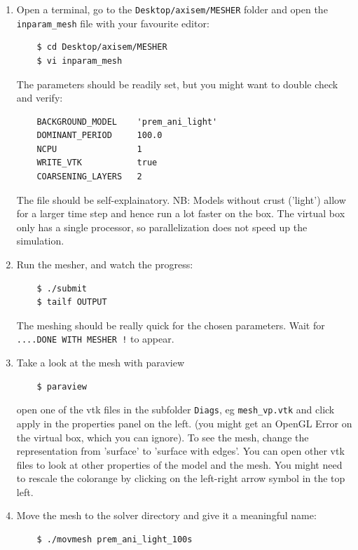 \documentclass{article}
\begin{document}
\begin{enumerate}
    \item Open a terminal, go to the \verb|Desktop/axisem/MESHER| folder and open the
    \verb|inparam_mesh| file with your favourite editor:
    \begin{verbatim}
    $ cd Desktop/axisem/MESHER
    $ vi inparam_mesh
    \end{verbatim}
    The parameters should be readily set, but you might want to double check and verify:
    \begin{verbatim}
    BACKGROUND_MODEL    'prem_ani_light'
    DOMINANT_PERIOD     100.0
    NCPU                1
    WRITE_VTK           true
    COARSENING_LAYERS   2
    \end{verbatim}
    The file should be self-explainatory. NB: Models without crust ('light') allow for a
    larger time step and hence run a lot faster on the box. The virtual box only has a
    single processor, so parallelization does not speed up the simulation.

    \item Run the mesher, and watch the progress:
    \begin{verbatim}
    $ ./submit
    $ tailf OUTPUT
    \end{verbatim}
    The meshing should be really quick for the chosen parameters. Wait for 
    \verb|....DONE WITH MESHER !| to appear.

    \item Take a look at the mesh with paraview
    \begin{verbatim}
    $ paraview
    \end{verbatim}
    open one of the vtk files in the subfolder \verb|Diags|, eg \verb|mesh_vp.vtk|
    and click apply in the properties panel on the left. (you might get an OpenGL Error
    on the virtual box, which you can ignore). To see the mesh, change the representation
    from 'surface' to 'surface with edges'. You can open other vtk files to look at other
    properties of the model and the mesh. You might need to rescale the colorange by
    clicking on the left-right arrow symbol in the top left.
    
    \item Move the mesh to the solver directory and give it a meaningful name:
    \begin{verbatim}
    $ ./movmesh prem_ani_light_100s
    \end{verbatim}

\end{enumerate}
\end{document}
